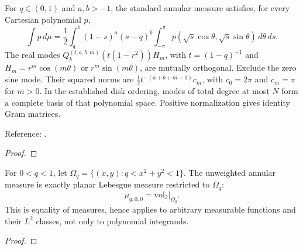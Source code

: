 \begin{theorem}
\label{thm:zernike-annulus-basis}
\leanok
For $q\in(0,1)$ and $a,b>-1$, the standard annular measure satisfies, for every
Cartesian polynomial $p$,
\[
 \int p\,d\mu=\frac12\int_q^1(1-s)^a(s-q)^b
 \int_{-\pi}^{\pi}p(\sqrt{s}\cos\theta,\sqrt{s}\sin\theta)\,d\theta\,ds.
\]
The real modes $Q_k^{(t,a,b,m)}(t(1-r^2))H_m$, with $t=(1-q)^{-1}$ and
$H_m=r^m\cos(m\theta)$ or $r^m\sin(m\theta)$, are mutually orthogonal.
Exclude the zero sine mode. Their squared norms are
$\frac12t^{-(a+b+m+1)}c_m$, with $c_0=2\pi$ and $c_m=\pi$ for $m>0$.
In the established disk ordering, modes of total degree at most $N$ form a
complete basis of that polynomial space. Positive normalization gives identity
Gram matrices.

Reference: \cite[Definition 4.1 and Proposition 4.2]{pgso}.
\end{theorem}
\begin{proof}
\leanok
\end{proof}

\begin{theorem}
\label{thm:annular-area-measure}
\leanok
For $0<q<1$, let $\Omega_q=\{(x,y):q<x^2+y^2<1\}$.
The unweighted annular measure is exactly planar Lebesgue measure restricted
to $\Omega_q$:
\[
 \mu_{q,0,0}=\left.\mathrm{vol}_2\right|_{\Omega_q}.
\]
This is equality of measures, hence applies to arbitrary measurable functions
and their $L^2$ classes, not only to polynomial integrands.
\end{theorem}
\begin{proof}
\leanok
\end{proof}

